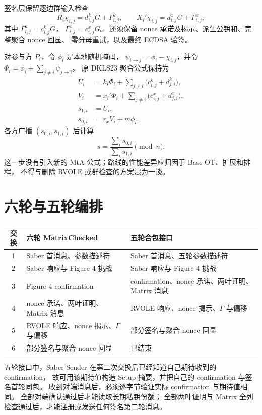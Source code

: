 签名层保留逐边群输入检查
\[
  R_i\chi_{i,j}=d^k_{i,j}G+\Gamma^k_{i,j},\qquad
  X_i'\chi_{i,j}=d^x_{i,j}G+\Gamma^x_{i,j},
\]
其中 $\Gamma^k_{i,j}=c^k_{i,j}G$，
$\Gamma^x_{i,j}=c^x_{i,j}G$。
还须保留 nonce 承诺及揭示、派生公钥和、完整聚合 nonce 回显、
零分母重试，以及最终 ECDSA 验签。

对参与方 $P_i$，令 $\phi_i$ 是本地随机掩码，
$\psi_{i\to j}=\phi_i-\chi_{i,j}$，并令
$\Phi_i=\phi_i+\sum_{j\ne i}\psi_{j\to i}$。
原 DKLS23 聚合公式保持为
\[
  \begin{aligned}
    U_i&=k_i\Phi_i+
      \sum_{j\ne i}\bigl(c^k_{i,j}+d^k_{j,i}\bigr),\\
    V_i&=x_i'\Phi_i+
      \sum_{j\ne i}\bigl(c^x_{i,j}+d^x_{j,i}\bigr),\\
    s_{1,i}&=U_i,\\
    s_{0,i}&=r_xV_i+m\phi_i.
  \end{aligned}
\]
各方广播 $(s_{0,i},s_{1,i})$ 后计算
\[
  s=\frac{\sum_i s_{0,i}}{\sum_i s_{1,i}}\pmod n.
\]
这一步没有引入新的 MtA 公式；路线的性能差异应归因于 Base OT、扩展和排程，
不得与删除 RVOLE 或群检查的方案混为一谈。

\section{六轮与五轮编排}

\begin{center}
\begin{tabular}{c p{} p{}}
\toprule
交换 & 六轮 MatrixChecked & 五轮合包接口 \\
\midrule
1 & Saber 首消息、参数描述符 & Saber 首消息、五轮参数描述符 \\
2 & Saber 响应与 Figure 4 挑战 & Saber 响应与 Figure 4 挑战 \\
3 & Figure 4 confirmation & confirmation、nonce 承诺、两叶证明、Matrix 消息 \\
4 & nonce 承诺、两叶证明、Matrix 消息 & RVOLE 响应、nonce 揭示、$\Gamma$ 与偏移 \\
5 & RVOLE 响应、nonce 揭示、$\Gamma$ 与偏移 & 部分签名与聚合 nonce 回显 \\
6 & 部分签名与聚合 nonce 回显 & 已结束 \\
\bottomrule
\end{tabular}
\end{center}

五轮接口中，Saber Sender 在第二次交换后已经知道自己期待收到的 confirmation，
故可用该期待值构造 Setup 摘要，并把自己的 confirmation 与签名首轮同包。
收到对端消息后，必须逐字节验证实际 confirmation 与期待值相同。
全部对端确认通过后才能读取长期私钥份额；
全部两叶证明与 Matrix 全列检查通过后，才能注册或发送任何签名第二轮消息。

